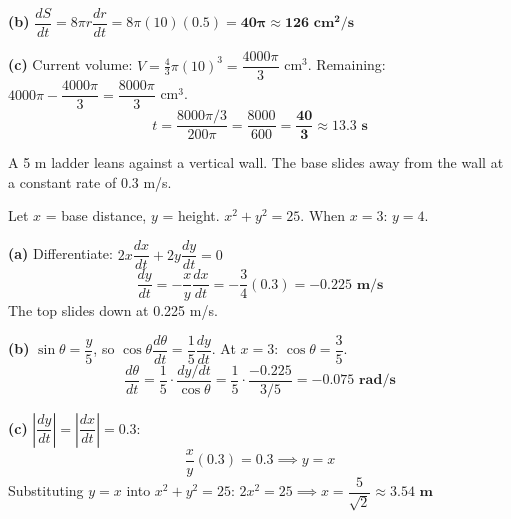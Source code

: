 \documentclass[addpoints]{exam}
\begin{document}
\begin{questions}
\begin{solution}[9cm]
\textbf{(b)} $\dfrac{dS}{dt} = 8\pi r \dfrac{dr}{dt} = 8\pi(10)(0.5) = \mathbf{40\pi \approx 126 \text{ cm}^2/\text{s}}$

\textbf{(c)} Current volume: $V = \tfrac{4}{3}\pi(10)^3 = \dfrac{4000\pi}{3}$ cm$^3$.
Remaining: $4000\pi - \dfrac{4000\pi}{3} = \dfrac{8000\pi}{3}$ cm$^3$.
\[
t = \frac{8000\pi/3}{200\pi} = \frac{8000}{600} = \mathbf{\frac{40}{3} \approx 13.3 \text{ s}}
\]
\end{solution}

\question A 5 m ladder leans against a vertical wall. The base slides away from the wall
at a constant rate of 0.3 m/s.
\begin{solution}[9cm]
Let $x$ = base distance, $y$ = height. $x^2 + y^2 = 25$.\quad
When $x = 3$: $y = 4$.

\textbf{(a)} Differentiate: $2x\dfrac{dx}{dt} + 2y\dfrac{dy}{dt} = 0$
\[
\frac{dy}{dt} = -\frac{x}{y}\frac{dx}{dt} = -\frac{3}{4}(0.3) = \mathbf{-0.225 \text{ m/s}}
\]
The top slides down at 0.225 m/s.

\textbf{(b)} $\sin\theta = \dfrac{y}{5}$, so $\cos\theta\dfrac{d\theta}{dt} =
\dfrac{1}{5}\dfrac{dy}{dt}$.
At $x = 3$: $\cos\theta = \dfrac{3}{5}$.
\[
\frac{d\theta}{dt} = \frac{1}{5} \cdot \frac{dy/dt}{\cos\theta}
= \frac{1}{5} \cdot \frac{-0.225}{3/5} = \mathbf{-0.075 \text{ rad/s}}
\]

\textbf{(c)} $\left|\dfrac{dy}{dt}\right| = \left|\dfrac{dx}{dt}\right| = 0.3$:
\[
\frac{x}{y}(0.3) = 0.3 \implies y = x
\]
Substituting $y = x$ into $x^2 + y^2 = 25$: $2x^2 = 25 \implies x = \dfrac{5}{\sqrt{2}}
\approx \mathbf{3.54 \text{ m}}$
\end{solution}


\end{questions}
\end{document}
